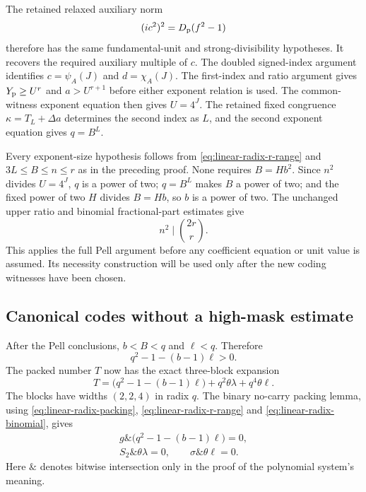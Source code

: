 The retained relaxed auxiliary norm
\[
 (ic^2)^2=D_{\rm p}(f^2-1)
\]
therefore has the same fundamental-unit and strong-divisibility
hypotheses. It recovers the required auxiliary multiple of $c$.
The doubled signed-index argument identifies
$c=\psi_A(J)$ and $d=\chi_A(J)$. The first-index and ratio
argument gives $Y_{\rm p}\ge U^r$ and $a>U^{r+1}$ before either
exponent relation is used. The common-witness exponent equation
then gives $U=4^J$. The retained fixed congruence
$\kappa=T_L+\Delta a$ determines the second index as $L$, and
the second exponent equation gives $q=B^L$.

Every exponent-size hypothesis follows from
\eqref{eq:linear-radix-r-range} and $3L\le B\le n\le r$ as
in the preceding proof. None requires $B=Hb^2$. Since $n^2$ divides
$U=4^J$, $q$ is a power of two; $q=B^L$ makes $B$ a power of two;
and the fixed power of two $H$ divides $B=Hb$, so $b$ is a power
of two. The unchanged upper ratio and binomial fractional-part
estimates give
\begin{equation}\label{eq:linear-radix-binomial}
 n^2\mid\binom{2r}{r}.
\end{equation}
This applies the full Pell argument before any coefficient
equation or unit value is assumed. Its necessity construction
will be used only after the new coding witnesses have been chosen.

\subsection{Canonical codes without a high-mask estimate}

After the Pell conclusions, $b<B<q$ and $\ell<q$. Therefore
\begin{equation}\label{eq:linear-radix-no-borrow}
 q^2-1-(b-1)\ell>0.
\end{equation}
The packed number $T$ now has the exact three-block expansion
\[
 T=\bigl(q^2-1-(b-1)\ell\bigr)
                +q^2\theta\lambda+q^4\theta\ell.
\]
The blocks have widths $(2,2,4)$ in radix $q$. The binary
no-carry packing lemma, using
\eqref{eq:linear-radix-packing}, \eqref{eq:linear-radix-r-range}
and \eqref{eq:linear-radix-binomial}, gives
\begin{equation}\label{eq:linear-radix-masks}
 \begin{gathered}
 g\mathbin{\&}\bigl(q^2-1-(b-1)\ell\bigr)=0,\\
 S_2\mathbin{\&}\theta\lambda=0,\qquad
 \sigma\mathbin{\&}\theta\ell=0.
 \end{gathered}
\end{equation}
Here $\mathbin{\&}$ denotes bitwise intersection only in the
proof of the polynomial system's meaning.

